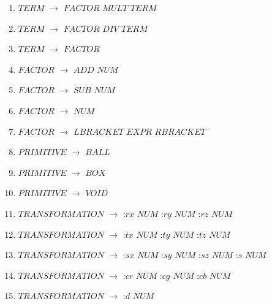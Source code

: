 \begin{enumerate}
\item $TERM$ $\rightarrow$ $FACTOR$ $MULT$ $TERM$\\
\item $TERM$ $\rightarrow$ $FACTOR$ $DIV$ $TERM$\\
\item $TERM$ $\rightarrow$ $FACTOR$\\

\item $FACTOR$ $\rightarrow$ $ADD$ $NUM$ \\
\item $FACTOR$ $\rightarrow$ $SUB$ $NUM$ \\
\item $FACTOR$ $\rightarrow$ $NUM$ \\
\item $FACTOR$ $\rightarrow$ $LBRACKET$ $EXPR$ $RBRACKET$\\



\item $PRIMITIVE$   	$\rightarrow$  $BALL$\\
\item $PRIMITIVE$   	$\rightarrow$  $BOX$\\
\item $PRIMITIVE$   	$\rightarrow$  $VOID$\\

\item $TRANSFORMATION$  $\rightarrow$   :$rx$ $NUM$ \textbar :$ry$ $NUM$ \textbar :$rz$ $NUM$ \\
\item $TRANSFORMATION$	$\rightarrow$	:$tx$ $NUM$ \textbar :$ty$ $NUM$ \textbar :$tz$ $NUM$ \\
\item $TRANSFORMATION$	$\rightarrow$	:$sx$ $NUM$ \textbar :$sy$ $NUM$ \textbar :$sz$ $NUM$ \textbar :$s$ $NUM$ \\
\item $TRANSFORMATION$ 	$\rightarrow$	:$cr$ $NUM$ \textbar :$cg$ $NUM$ \textbar :$cb$ $NUM$ \\
\item $TRANSFORMATION$	$\rightarrow$	:$d$  $NUM$ \\

\end{enumerate}

\noindent

